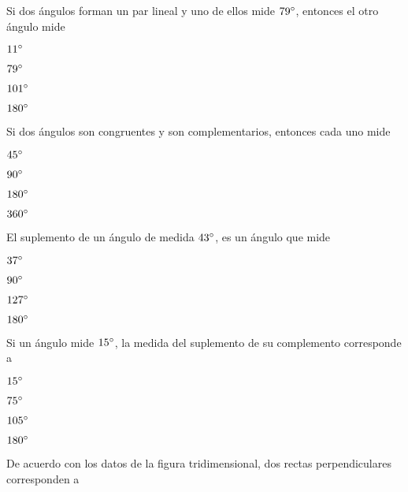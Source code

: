 \documentclass[12pt, fleqn]{article}
\begin{document}
\item Si dos ángulos forman un par lineal y uno de ellos mide $79^\circ$, entonces el otro ángulo mide \vspace{2mm}
\vp

\benu
\item[] \opc $11^\circ$\vf
\item[] \opc $79^\circ$\vf
\item[] \opc $101^\circ$\vf
\item[] \opc $180^\circ$
\eenu
\vs

\item Si dos ángulos son congruentes y son complementarios, entonces cada uno mide \vp

\benu
\item[] \opc $45^\circ$ \vf
\item[] \opc $90^\circ$ \vf
\item[] \opc $180^\circ$ \vf
\item[] \opc $360^\circ$
\eenu\vs

\item El suplemento de un ángulo de medida $43^\circ$, es un ángulo que mide \vp

\benu
\item[] \opc $37^\circ$ \vf
\item[] \opc $90^\circ$ \vf
\item[] \opc $127^\circ$ \vf
\item[] \opc $180^\circ$
\eenu\vs

\item Si un ángulo mide $15^\circ$, la medida del suplemento de su complemento corresponde a \vp

\benu
\item[] \opc $15^\circ$ \vf
\item[] \opc $75^\circ$ \vf
\item[] \opc $105^\circ$ \vf
\item[] \opc $180^\circ$
\eenu

\pagebreak

\item De acuerdo con los datos de la figura tridimensional, dos rectas perpendiculares corresponden a
\end{document}
